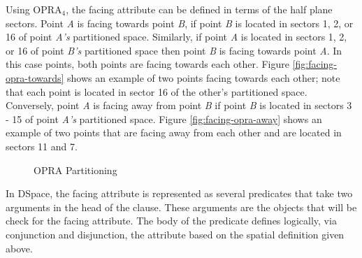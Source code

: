 \documentclass[12pt]{ucthesis}
\begin{document}
Using OPRA$_{4}$, the facing attribute can be defined in terms of the half plane sectors. Point \emph{A} is facing towards point \emph{B}, if point \emph{B} is located in sectors 1, 2, or 16 of point \emph{A's} partitioned space. Similarly, if point \emph{A} is located in sectors 1, 2, or 16 of point \emph{B's} partitioned space then point \emph{B} is facing towards point \emph{A}. In this case points, both points are facing towards each other. Figure \ref{fig:facing-opra-towards} shows an example of two points facing towards each other; note that each point is located in sector 16 of the other's partitioned space. Conversely,  point \emph{A} is facing away from point \emph{B} if point \emph{B} is located in sectors 3 - 15 of point \emph{A's} partitioned space. Figure \ref{fig:facing-opra-away} shows an example of two points that are facing away from each other and are located in sectors 11 and 7. 

\begin{figure}[H]
 \centering
  \hspace{10 mm}
 \caption{OPRA Partitioning }
\label{opra-facing}
\end{figure}

In DSpace, the facing attribute is represented as several predicates that take two arguments in the head of the clause. These arguments are the objects that will be check for the facing attribute. The body of the predicate defines logically, via conjunction and disjunction, the attribute based on the spatial definition given above.
\end{document}
